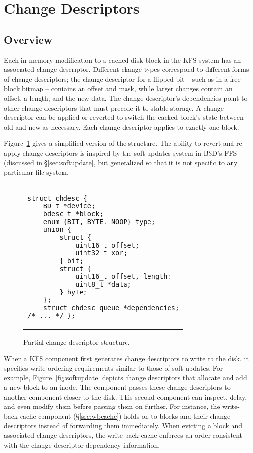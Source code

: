 \section {Change Descriptors}
\label{sec:chdescs}

\subsection {Overview}
Each in-memory modification to a cached disk block in the KFS system has an
associated change descriptor. Different change types correspond to different
forms of change descriptors; the change descriptor for a flipped bit -- such as
in a free-block bitmap -- contains an offset and mask, while larger changes
contain an offset, a length, and the new data. The change descriptor's
dependencies point to other change descriptors that must precede it to stable
storage. A change descriptor can be applied or reverted to switch the cached
block's state between old and new as necessary. Each change descriptor applies
to exactly one block.

Figure~\ref{fig:chdesc} gives a simplified version of the structure. The ability
to revert and re-apply change descriptors is inspired by the soft updates system
in BSD's FFS~\cite{ganger00soft} (discussed in \S\ref{sec:softupdate}, but
generalized so that it is not specific to any particular file system.

\begin{figure}
\vskip-14pt
\begin{tabular}{@{\hskip0.58in}p{2in}@{}}
\begin{scriptsize}
\begin{verbatim}
struct chdesc {
    BD_t *device;
    bdesc_t *block;
    enum {BIT, BYTE, NOOP} type;
    union {
        struct {
            uint16_t offset;
            uint32_t xor;
        } bit;
        struct {
            uint16_t offset, length;
            uint8_t *data;
        } byte;
    };
    struct chdesc_queue *dependencies;
/* ... */ };
\end{verbatim}
\end{scriptsize}
\end{tabular}
\vspace{-10pt}
\caption{\label{fig:chdesc} Partial change descriptor structure.}
\end{figure}

When a KFS component first generates change descriptors to write to the disk, it
specifies write ordering requirements similar to those of soft updates. For
example, Figure~\ref{fig:softupdate} depicts change descriptors that allocate
and add a new block to an inode. The component passes these change descriptors
to another component closer to the disk. This second component can inspect,
delay, and even modify them before passing them on further. For instance, the
write-back cache component (\S\ref{sec:wbcache}) holds on to blocks and their
change descriptors instead of forwarding them immediately. When evicting a block
and associated change descriptors, the write-back cache enforces an order
consistent with the change descriptor dependency information.

